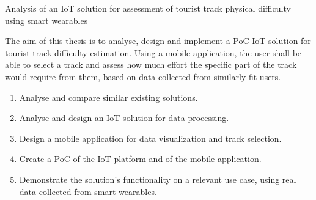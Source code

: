 \linebreak
Analysis of an IoT solution for assessment of tourist track physical difficulty using smart wearables

The aim of this thesis is to analyse, design and implement a PoC IoT solution for tourist track difficulty estimation.
Using a mobile application, the user shall be able to select a track and assess how much effort the specific part of the track would require from them, based on data collected from similarly fit users.
\begin{enumerate}
    \item Analyse and compare similar existing solutions.
    \item Analyse and design an IoT solution for data processing.
    \item Design a mobile application for data visualization and track selection.
    \item Create a PoC of the IoT platform and of the mobile application.
    \item Demonstrate the solution's functionality on a relevant use case, using real data collected from smart wearables.
\end{enumerate}
